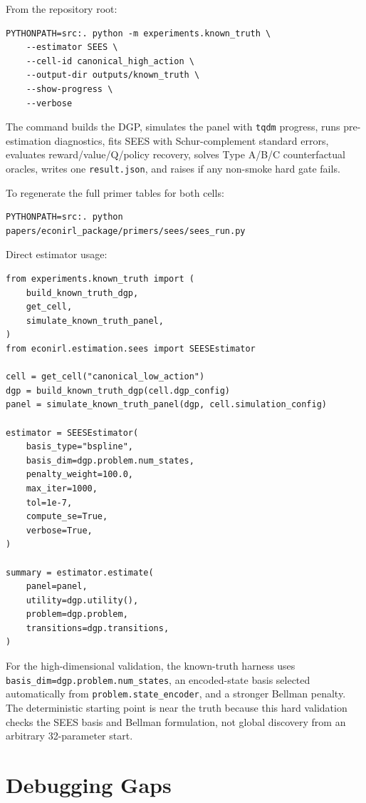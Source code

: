 \documentclass[10pt]{article}
\begin{document}
From the repository root:

\begin{lstlisting}
PYTHONPATH=src:. python -m experiments.known_truth \
    --estimator SEES \
    --cell-id canonical_high_action \
    --output-dir outputs/known_truth \
    --show-progress \
    --verbose
\end{lstlisting}

The command builds the DGP, simulates the panel with \texttt{tqdm} progress,
runs pre-estimation diagnostics, fits SEES with Schur-complement standard
errors, evaluates reward/value/Q/policy recovery, solves Type A/B/C
counterfactual oracles, writes one \texttt{result.json}, and raises if any
non-smoke hard gate fails.

To regenerate the full primer tables for both cells:

\begin{lstlisting}
PYTHONPATH=src:. python papers/econirl_package/primers/sees/sees_run.py
\end{lstlisting}

Direct estimator usage:

\begin{lstlisting}
from experiments.known_truth import (
    build_known_truth_dgp,
    get_cell,
    simulate_known_truth_panel,
)
from econirl.estimation.sees import SEESEstimator

cell = get_cell("canonical_low_action")
dgp = build_known_truth_dgp(cell.dgp_config)
panel = simulate_known_truth_panel(dgp, cell.simulation_config)

estimator = SEESEstimator(
    basis_type="bspline",
    basis_dim=dgp.problem.num_states,
    penalty_weight=100.0,
    max_iter=1000,
    tol=1e-7,
    compute_se=True,
    verbose=True,
)

summary = estimator.estimate(
    panel=panel,
    utility=dgp.utility(),
    problem=dgp.problem,
    transitions=dgp.transitions,
)
\end{lstlisting}

For the high-dimensional validation, the known-truth harness uses
\texttt{basis\_dim=dgp.problem.num\_states}, an encoded-state basis selected
automatically from \texttt{problem.state\_encoder}, and a stronger Bellman
penalty. The deterministic starting point is near the truth because this hard
validation checks the SEES basis and Bellman formulation, not global discovery
from an arbitrary 32-parameter start.



\section{Debugging Gaps}
\end{document}
